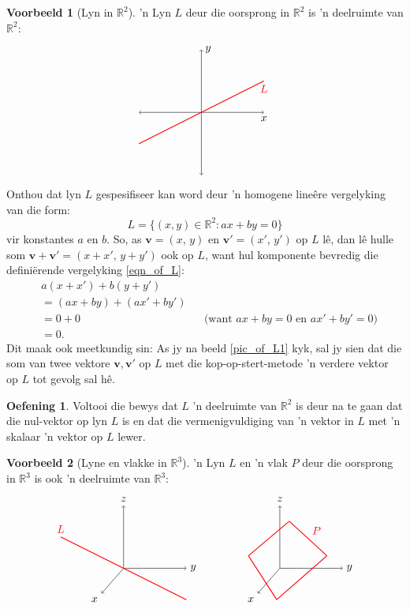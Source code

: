 \documentclass[a4paper,11pt]{book}
\theoremstyle{definition}
\newtheorem{exercise}{Oefening}
\newtheorem{example_environment}{Voorbeeld}[chapter]
\newcommand{\be}{\begin{equation}}
\newcommand{\ee}{\end{equation}}
\newcommand{\ba}{\begin{aligned}}
\newcommand{\ea}{\end{aligned}}
\newcommand{\ve}[1]{\mathbf{#1}}
\newenvironment{example}
	{
		\begin{oframed}
		\begin{example_environment}
	}
	{
		\end{example_environment}
		\end{oframed}
	}
\begin{document}
\begin{example}[Lyn in $\mathbb{R}^2$] 'n Lyn $L$ deur die oorsprong in
	$\mathbb{R}^2$ is 'n deelruimte van $\mathbb{R}^2$:
	\be \label{pic_of_L1}
	\ba
	\begin{tikzpicture}
		\draw[<->] (-2, 0) -- (2,0) node[below] {$x$};
		\draw[<->] (0, -2) -- (0, 2) node[right] {$y$};
		\draw[thick, red] (-2, -1) -- (2, 1) node[below] {$L$};
	\end{tikzpicture}
	\ea
	\ee
	Onthou dat lyn $L$ gespesifiseer kan word deur 'n homogene line{\^e}re
	vergelyking van die form:
	\be \label{eqn_of_L}
	L = \{ (x,y) \in \mathbb{R}^2 : ax + by = 0 \}
	\ee
	vir konstantes $a$ en $b$. So, as $\ve{v} = (x, \, y)$ en $\ve{v}' =
	(x', \, y')$ op $L$ l{\^e}, dan l{\^e} hulle som $\ve{v} + \ve{v}' = (x
	+ x', \, y + y')$ ook op $L$, want hul komponente bevredig die
	defini{\"e}rende vergelyking \eqref{eqn_of_L}:
	\begin{align*}
		&a(x + x') + b (y + y')\\
		& = (ax + by) + (ax' + by') \\
		&= 0 + 0 && \mbox{(want $ax + by = 0$ en $ax' + by' = 0$)} \\
		&= 0.
	\end{align*}
	Dit maak ook meetkundig sin: As jy na beeld \eqref{pic_of_L1} kyk, sal
	jy sien dat die som van twee vektore $\ve{v}, \ve{v}'$ op $L$ met die
	kop-op-stert-metode 'n verdere vektor op $L$ tot gevolg sal h{\^e}.
	\begin{exercise} Voltooi die bewys dat $L$ 'n deelruimte van
		$\mathbb{R}^2$ is deur na te gaan dat die nul-vektor op lyn $L$ is
		en dat die vermenigvuldiging van 'n vektor in $L$ met 'n skalaar 'n
		vektor op $L$ lewer.
	\end{exercise}
\end{example}

\begin{example}[Lyne en vlakke in $\mathbb{R}^3$] 'n Lyn $L$ en 'n vlak $P$
	deur die oorsprong in $\mathbb{R}^3$ is ook 'n deelruimte van
	$\mathbb{R}^3$:
	\be \label{pic_of_L}
	\ba
	\begin{tikzpicture}
		\draw[->] (0, 0) -- (2,0) node[right] {$y$};
		\draw[->] (0, 0) -- (0, 2) node[above] {$z$};
		\draw[->] (0,0) -- (-0.7, -0.8) node[below left] {$x$};
		\draw[thick, red] (-2, 1) node[above] {$L$} -- (2, -1);
	\end{tikzpicture}
	\ea
	\qquad \qquad
	\ba
	\begin{tikzpicture}
		\draw[->] (0, 0) -- (2,0) node[right] {$y$};
		\draw[->] (0, 0) -- (0, 2) node[above] {$z$};
		\draw[->] (0,0) -- (-0.7, -0.8) node[below left] {$x$};
		\draw[thick, red] (-0.1, -1) -- (-1, 0.4);
		\draw[thick, red] (-1, 0.4) -- (0.3, 1.5);
		\draw[thick, red] (0.3, 1.5) -- node[above right] {$P$} (1.5, 0.4);
		\draw[thick, red] (1.5, 0.4) -- (-0.1, -1);
	\end{tikzpicture}
	\ea
	\ee

\end{example}
\end{document}
